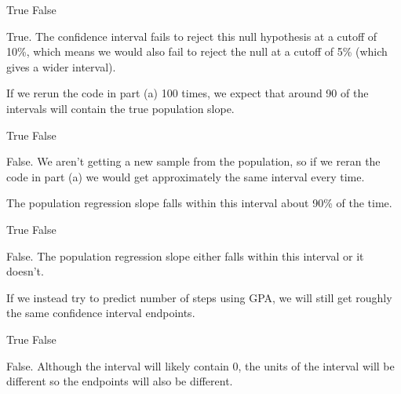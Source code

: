 \begin{parts}
\begin{subparts}
    \begin{oneparcheckboxes}
      \correctchoice True
      \choice False
    \end{oneparcheckboxes}

    \begin{solutionorbox}[0.8in]
      True. The confidence interval fails to reject this null hypothesis at a
      cutoff of 10\%, which means we would also fail to reject the null at a
      cutoff of 5\% (which gives a wider interval).
    \end{solutionorbox}

  \subpart If we rerun the code in part (a) 100 times, we expect that around 90
    of the intervals will contain the true population slope.

    \begin{oneparcheckboxes}
      \choice True
      \correctchoice False
    \end{oneparcheckboxes}

    \begin{solutionorbox}[0.8in]
      False. We aren't getting a new sample from the population, so if we reran
      the code in part (a) we would get approximately the same interval every
      time.
    \end{solutionorbox}

  \subpart The population regression slope falls within this interval about
    90\% of the time.

    \begin{oneparcheckboxes}
      \choice True
      \correctchoice False
    \end{oneparcheckboxes}

    \begin{solutionorbox}[0.8in]
      False. The population regression slope either falls within this
      interval or it doesn't.
    \end{solutionorbox}

  \subpart If we instead try to predict number of steps using GPA, we will
    still get roughly the same confidence interval endpoints.

    \begin{oneparcheckboxes}
      \choice True
      \correctchoice False
    \end{oneparcheckboxes}

    \begin{solutionorbox}[0.8in]
      False. Although the interval will likely contain 0, the units of the
      interval will be different so the endpoints will also be different.
    \end{solutionorbox}
\end{subparts}


\end{parts}

